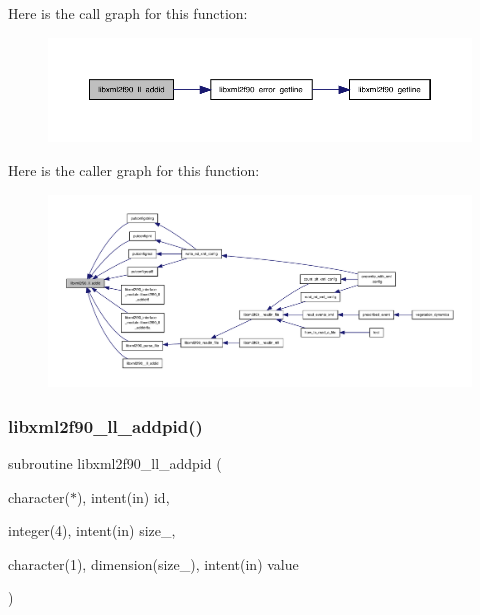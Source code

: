 Here is the call graph for this function\+:
\nopagebreak
\begin{figure}[H]
\begin{center}
\leavevmode
\includegraphics[width=350pt]{libxml2f90_8f90__pp_8f90_aedf302b29e22ba3b7312a7650ac0134b_cgraph}
\end{center}
\end{figure}
Here is the caller graph for this function\+:
\nopagebreak
\begin{figure}[H]
\begin{center}
\leavevmode
\includegraphics[width=350pt]{libxml2f90_8f90__pp_8f90_aedf302b29e22ba3b7312a7650ac0134b_icgraph}
\end{center}
\end{figure}
\mbox{\label{libxml2f90_8f90__pp_8f90_a844ec38349c1e4d4537237258b453eda}} 
\subsubsection{\texorpdfstring{libxml2f90\+\_\+ll\+\_\+addpid()}{libxml2f90\_ll\_addpid()}}
{\footnotesize\ttfamily subroutine libxml2f90\+\_\+ll\+\_\+addpid (\begin{DoxyParamCaption}\item[{character($\ast$), intent(in)}]{id,  }\item[{integer(4), intent(in)}]{size\+\_\+,  }\item[{character(1), dimension(size\+\_\+), intent(in)}]{value }\end{DoxyParamCaption})}

